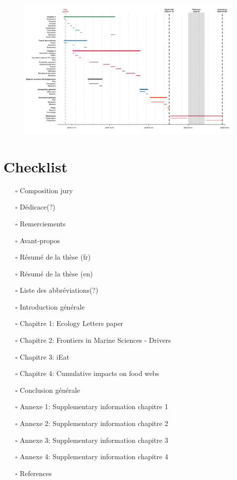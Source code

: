\blandscape
\begin{figure}[H]
\centering
\includegraphics[width=\columnwidth]{./timeline.png}
\label{timeline}
\end{figure}
\elandscape
\newpage

\hypertarget{checklist}{%
\section{Checklist}\label{checklist}}

\begin{itemize}
\tightlist
\item[$\square$]
  Composition jury
\item[$\square$]
  Dédicace(?)
\item[$\square$]
  Remerciements
\item[$\square$]
  Avant-propos
\item[$\square$]
  Résumé de la thèse (fr)
\item[$\square$]
  Résumé de la thèse (en)
\item[$\square$]
  Liste des abbréviations(?)
\item[$\square$]
  Introduction générale
\item[$\square$]
  Chapitre 1: Ecology Letters paper
\item[$\square$]
  Chapitre 2: Frontiers in Marine Sciences - Drivers
\item[$\square$]
  Chapitre 3: iEat
\item[$\square$]
  Chapitre 4: Cumulative impacts on food webs
\item[$\square$]
  Conclusion générale
\item[$\square$]
  Annexe 1: Supplementary information chapitre 1
\item[$\square$]
  Annexe 2: Supplementary information chapitre 2
\item[$\square$]
  Annexe 3: Supplementary information chapitre 3
\item[$\square$]
  Annexe 4: Supplementary information chapitre 4
\item[$\square$]
  References
\end{itemize}

